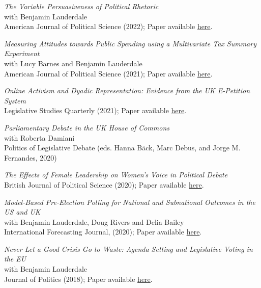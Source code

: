 \documentclass[centered]{res}
\begin{document}
\begin{resume}
{\sl The Variable Persuasiveness of Political Rhetoric} \\
with Benjamin Lauderdale\\
American Journal of Political Science (2022); Paper available \href{https://www.jackblumenau.com/papers/persuasion.pdf} {here}.

{\sl Measuring Attitudes towards Public Spending using a Multivariate Tax Summary Experiment} \\
with Lucy Barnes and Benjamin Lauderdale\\
American Journal of Political Science (2021); Paper available \href{https://www.jackblumenau.com/papers/spending_experiment.pdf} {here}.

{\sl Online Activism and Dyadic Representation: Evidence from the UK E-Petition System} \\
Legislative Studies Quarterly (2021); Paper available \href{https://www.jackblumenau.com/papers/petitions.pdf} {here}.

{\sl Parliamentary Debate in the UK House of Commons} \\
with Roberta Damiani \\
Politics of Legislative Debate (eds. Hanna B{\"a}ck, Marc Debus, and Jorge M. Fernandes, 2020) 

{\sl The Effects of Female Leadership on Women's Voice in Political Debate} \\
British Journal of Political Science (2020); Paper available \href{https://www.cambridge.org/core/journals/british-journal-of-political-science/article/effects-of-female-leadership-on-womens-voice-in-political-debate/146CC7A7C2965ACBEC82BC328BD2D5F2} {here}.

{\sl Model-Based Pre-Election Polling for National and Subnational Outcomes in the US and UK} \\
with Benjamin Lauderdale, Doug Rivers and Delia Bailey\\ 
International Forecasting Journal, (2020); Paper available \href{https://www.sciencedirect.com/science/article/abs/pii/S016920701930189X} {here}.

{\sl Never Let a Good Crisis Go to Waste: Agenda Setting and Legislative Voting in the EU} \\
with Benjamin Lauderdale\\
Journal of Politics (2018); Paper available \href{https://www.journals.uchicago.edu/doi/abs/10.1086/694543} {here}.


\end{resume}
\end{document}
